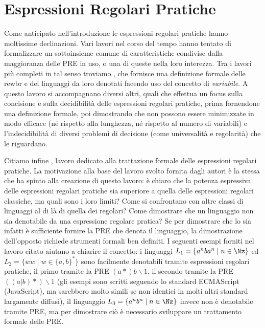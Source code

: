 
\chapter{Espressioni Regolari Pratiche}

Come anticipato nell'introduzione le espressioni regolari pratiche hanno moltissime declinazioni. Vari lavori nel corso del tempo hanno tentato di formalizzare un sottoinsieme comune di caratteristiche condivise dalla maggioranza delle PRE in uso, o una di queste nella loro interezza. Tra i lavori più completi in tal senso troviamo \cite{alfred:patterns}, che fornisce una definizione formale delle rewbr e dei linguaggi da loro denotati facendo uso del concetto di \textit{variabile}. A questo lavoro si accompagnano diversi altri, quali \cite{freydenberger:pre} che effettua un focus sulla concisione e sulla decidibilità delle espressioni regolari pratiche, prima fornendone una definizione formale, poi dimostrando che non possono essere minimizzate in modo efficace (né rispetto alla lunghezza, né rispetto al numero di variabili) e l'indecidibilità di diversi problemi di decisione (come universalità e regolarità) che le riguardano.

Citiamo infine \cite{campeanu:formal_study}, lavoro dedicato alla trattazione formale delle espressioni regolari pratiche. La motivazione alla base del lavoro svolto fornita dagli autori è la stessa che ha spinto alla creazione di questo lavoro: è chiaro che la potenza espressiva delle espressioni regolari pratiche sia superiore a quella delle espressioni regolari classiche, ma quali sono i loro limiti? Come si confrontano con altre classi di linguaggi al di là di quella dei regolari? Come dimostrare che un linguaggio non sia denotabile da una espressione regolare pratica? Se per dimostrare che lo sia infatti è sufficiente fornire la PRE che denota il linguaggio, la dimostrazione dell'opposto richiede strumenti formali ben definiti. I seguenti esempi forniti nel lavoro citato aiutano a chiarire il concetto: i linguaggi $L_1 = \{a^nba^n \mid n \in \Nz\}$ ed $L_2 = \{ww \mid w \in \{a, b\}^*\}$ sono facilmente denotabili tramite espressioni regolari pratiche, il primo tramite la PRE $(a*)b\backslash1$, il secondo tramite la PRE $((a|b)*)\backslash1$ (gli esempi sono scritti seguendo lo standard ECMAScript (JavaScript), ma sarebbero molto simili se non identici in molti altri standard largamente diffusi), il linguaggio $L_3 = \{a^nb^n \mid n \in \Nz \}$ invece non è denotabile tramite PRE, ma per dimostrare ciò è necessario sviluppare un trattamento formale delle PRE.


